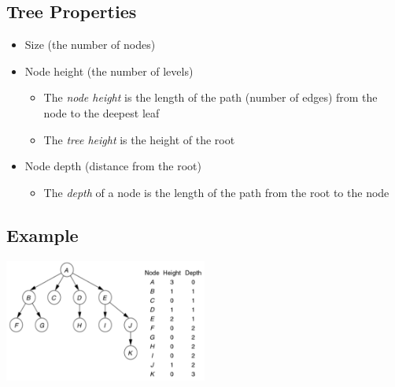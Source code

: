 \documentclass[10pt]{article}
\begin{document}
\subsection*{Tree Properties}
\begin{itemize}
    \item Size (the number of nodes)
    \item Node height (the number of levels)
    \begin{itemize}
        \item The \textit{node height} is the length of the path (number of edges) from the node to the deepest leaf
        \item The \textit{tree height} is the height of the root
    \end{itemize}
    \item Node depth (distance from the root)
    \begin{itemize}
        \item The \textit{depth} of a node is the length of the path from the root to the node
    \end{itemize}
\end{itemize}

\subsection*{Example}
\begin{center}
    \includegraphics[width = 0.5\textwidth]{images/img00007}    
\end{center}
\end{document}
